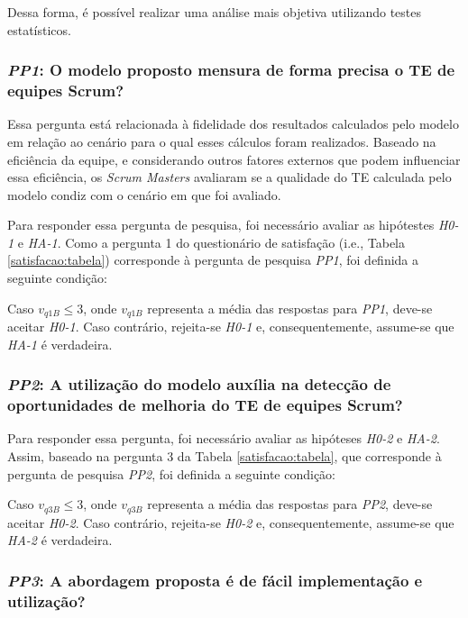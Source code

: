 Dessa forma, é possível realizar uma análise mais objetiva utilizando testes estatísticos.

\subsubsection{\textit{PP1}: O modelo proposto mensura de forma precisa o TE de equipes Scrum?}

Essa pergunta está relacionada à fidelidade dos resultados calculados pelo modelo em relação ao cenário para o qual esses cálculos foram realizados. Baseado na eficiência da equipe, e considerando outros fatores externos que podem influenciar essa eficiência, os \textit{Scrum Masters} avaliaram se a qualidade do TE calculada pelo modelo condiz com o cenário em que foi avaliado.

Para responder essa pergunta de pesquisa, foi necessário avaliar as hipótestes \textit{H0-1} e \textit{HA-1}. Como a pergunta 1 do questionário de satisfação (i.e., Tabela \ref{satisfacao:tabela}) corresponde à pergunta de pesquisa \textit{PP1}, foi definida a seguinte condição:

Caso $v_{q1B} \le 3$, onde $v_{q1B}$ representa a média das respostas para \textit{PP1}, deve-se aceitar \textit{H0-1}. Caso contrário, rejeita-se \textit{H0-1} e, consequentemente, assume-se que \textit{HA-1} é verdadeira.

\subsubsection{\textit{PP2}: A utilização do modelo auxília na detecção de oportunidades de melhoria do TE de equipes Scrum?}

Para responder essa pergunta, foi necessário avaliar as hipóteses \textit{H0-2} e \textit{HA-2}. Assim, baseado na pergunta 3 da Tabela \ref{satisfacao:tabela}, que corresponde à pergunta de pesquisa \textit{PP2}, foi definida a seguinte condição:

Caso $v_{q3B} \le 3$, onde $v_{q3B}$ representa a média das respostas para \textit{PP2}, deve-se aceitar \textit{H0-2}. Caso contrário, rejeita-se \textit{H0-2} e, consequentemente, assume-se que \textit{HA-2} é verdadeira.

\subsubsection{\textit{PP3}: A abordagem proposta é de fácil implementação e utilização?}

